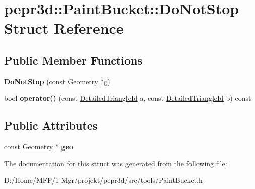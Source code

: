 \hypertarget{structpepr3d_1_1_paint_bucket_1_1_do_not_stop}{}\section{pepr3d\+::Paint\+Bucket\+::Do\+Not\+Stop Struct Reference}
\label{structpepr3d_1_1_paint_bucket_1_1_do_not_stop}
\subsection*{Public Member Functions}
\begin{DoxyCompactItemize}
\item 
\mbox{\label{structpepr3d_1_1_paint_bucket_1_1_do_not_stop_ab95dbddc4d5d645b8b347351f3c4ee77}} 
{\bfseries Do\+Not\+Stop} (const \mbox{\hyperlink{classpepr3d_1_1_geometry}{Geometry}} $\ast$g)
\item 
\mbox{\label{structpepr3d_1_1_paint_bucket_1_1_do_not_stop_a5255a131c1d4517545b5c44f24544d79}} 
bool {\bfseries operator()} (const \mbox{\hyperlink{structpepr3d_1_1_detailed_triangle_id}{Detailed\+Triangle\+Id}} a, const \mbox{\hyperlink{structpepr3d_1_1_detailed_triangle_id}{Detailed\+Triangle\+Id}} b) const
\end{DoxyCompactItemize}
\subsection*{Public Attributes}
\begin{DoxyCompactItemize}
\item 
\mbox{\label{structpepr3d_1_1_paint_bucket_1_1_do_not_stop_a78cccca6027d2a3dba5729692124ff14}} 
const \mbox{\hyperlink{classpepr3d_1_1_geometry}{Geometry}} $\ast$ {\bfseries geo}
\end{DoxyCompactItemize}


The documentation for this struct was generated from the following file\+:\begin{DoxyCompactItemize}
\item 
D\+:/\+Home/\+M\+F\+F/1-\/\+Mgr/projekt/pepr3d/src/tools/Paint\+Bucket.\+h\end{DoxyCompactItemize}
